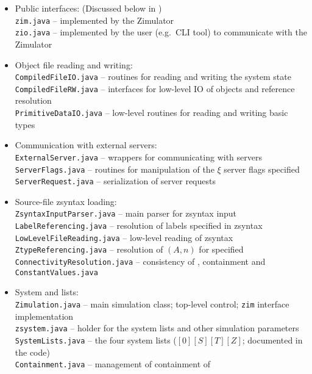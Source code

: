 \begin{itemize}
\item Public interfaces: (Discussed below in )\\
  {\tt   zim.java}  -- implemented by the Zimulator\\
  {\tt   zio.java} -- implemented by the user (e.g.~CLI tool) to communicate with the Zimulator
\item Object file reading and writing:\\
  {\tt   CompiledFileIO.java} -- routines for reading and writing the system state\\
  {\tt   CompiledFileRW.java} -- interfaces for low-level IO of objects and reference resolution\\
  {\tt   PrimitiveDataIO.java} -- low-level routines for reading and writing basic types
\item Communication with external servers:\\
  {\tt   ExternalServer.java}  -- wrappers for communicating with servers\\
  {\tt   ServerFlags.java} -- routines for manipulation of the $\xi$ server flags specified\\
  {\tt   ServerRequest.java} -- serialization of server requests
\item Source-file zsyntax loading:\\
  {\tt   ZsyntaxInputParser.java} -- main parser for zsyntax input\\
  {\tt   LabelReferencing.java}  -- resolution of labels specified in zsyntax\\
  {\tt   LowLevelFileReading.java} -- low-level reading of zsyntax\\
  {\tt   ZtypeReferencing.java} -- resolution of $(A,n)$ for specified \\
  {\tt   ConnectivityResolution.java} -- consistency of , containment and 
  {\tt   ConstantValues.java}
\item System and lists:\\
  {\tt   Zimulation.java} -- main simulation class; top-level control; {\tt zim} interface implementation\\
  {\tt   zsystem.java} -- holder for the system lists and other simulation parameters\\
  {\tt   SystemLists.java} -- the four system lists ($[0][S][T][Z]$; documented in the code)\\
  {\tt   Containment.java} -- management of containment of 

\end{itemize}
